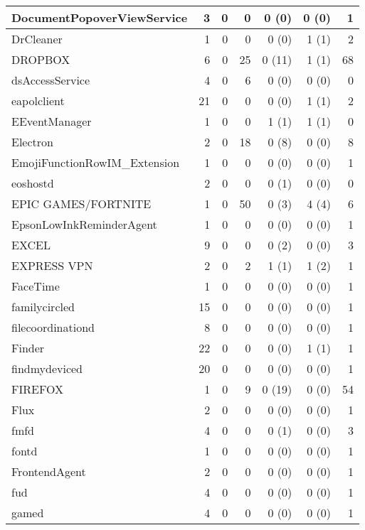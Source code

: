 \begin{adjustwidth}{-2in}{}
\begin{scriptsize}
\begin{longtable}[l]{ l | r | r | r | r | r | r }
    DocumentPopoverViewService & 3 &  0 &  0 &  0 (0) &  0 (0) &  1 \\ \hline
    DrCleaner &  1 &  0 &  0 &  0 (0) &  1 (1) &  2 \\ \hline
    DROPBOX &  6 &  0 & 25 & 0 (11) &  1 (1) & 68 \\ \hline
    dsAccessService &  4 &  0 &  6 &  0 (0) &  0 (0) &  0 \\ \hline
    eapolclient & 21 &  0 &  0 &  0 (0) &  1 (1) &  2 \\ \hline
    EEventManager &  1 &  0 &  0 &  1 (1) &  1 (1) &  0 \\ \hline
    Electron & 2 &  0 & 18 &  0 (8) &  0 (0) &  8 \\ \hline
    EmojiFunctionRowIM\_Extension & 1 &  0 &  0 &  0 (0) &  0 (0) &  1 \\ \hline
    eoshostd & 2 &  0 &  0 &  0 (1) &  0 (0) &  0 \\ \hline
    EPIC GAMES/FORTNITE &  1 &  0 & 50 &  0 (3) &  4 (4) &  6 \\ \hline
    EpsonLowInkReminderAgent & 1 &  0 &  0 &  0 (0) &  0 (0) &  1 \\ \hline
    EXCEL &  9 &  0 &  0 &  0 (2) &  0 (0) &  3 \\ \hline
    EXPRESS VPN &  2 &  0 &  2 &  1 (1) &  1 (2) &  1 \\ \hline
    FaceTime & 1 &  0 &  0 &  0 (0) &  0 (0) &  1 \\ \hline
    familycircled & 15 &  0 &  0 &  0 (0) &  0 (0) &  1 \\ \hline
    filecoordinationd &  8 &  0 &  0 &  0 (0) &  0 (0) &  1 \\ \hline
    Finder &  22 &  0 &  0 &  0 (0) &  1 (1) &  1 \\ \hline
    findmydeviced & 20 &  0 &  0 &  0 (0) &  0 (0) &  1 \\ \hline
    FIREFOX &  1 &  0 &  9 & 0 (19) &  0 (0) & 54 \\ \hline
    Flux & 2 &  0 &  0 &  0 (0) &  0 (0) &  1 \\ \hline
    fmfd & 4 &  0 &  0 &  0 (1) &  0 (0) &  3 \\ \hline
    fontd &  1 &  0 &  0 &  0 (0) &  0 (0) &  1 \\ \hline
    FrontendAgent &  2 &  0 &  0 &  0 (0) &  0 (0) &  1 \\ \hline
    fud &  4 &  0 &  0 &  0 (0) &  0 (0) &  1 \\ \hline
    gamed &  4 &  0 &  0 &  0 (0) &  0 (0) &  1 \\ \hline

\end{longtable}
\end{scriptsize}
\end{adjustwidth}

